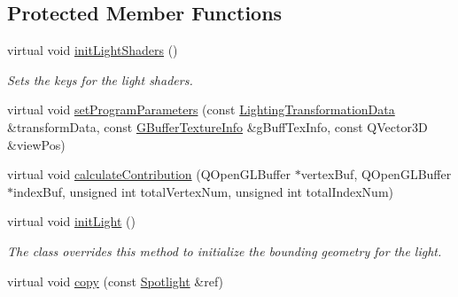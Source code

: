 \subsection*{Protected Member Functions}
\begin{DoxyCompactItemize}
\item 
\mbox{\label{class_geometry_engine_1_1_geometry_world_item_1_1_geometry_light_1_1_spotlight_a3e9b0e3c458ea56708a16f8f988b01ce}} 
virtual void \mbox{\hyperlink{class_geometry_engine_1_1_geometry_world_item_1_1_geometry_light_1_1_spotlight_a3e9b0e3c458ea56708a16f8f988b01ce}{init\+Light\+Shaders}} ()
\begin{DoxyCompactList}\small\item\em Sets the keys for the light shaders. \end{DoxyCompactList}\item 
virtual void \mbox{\hyperlink{class_geometry_engine_1_1_geometry_world_item_1_1_geometry_light_1_1_spotlight_a89686934756cc47dd810cc43d8f5f88a}{set\+Program\+Parameters}} (const \mbox{\hyperlink{class_geometry_engine_1_1_lighting_transformation_data}{Lighting\+Transformation\+Data}} \&transform\+Data, const \mbox{\hyperlink{class_geometry_engine_1_1_g_buffer_texture_info}{G\+Buffer\+Texture\+Info}} \&g\+Buff\+Tex\+Info, const Q\+Vector3D \&view\+Pos)
\item 
virtual void \mbox{\hyperlink{class_geometry_engine_1_1_geometry_world_item_1_1_geometry_light_1_1_spotlight_a6136ca2338a7b5f5be70ccab82fe655e}{calculate\+Contribution}} (Q\+Open\+G\+L\+Buffer $\ast$vertex\+Buf, Q\+Open\+G\+L\+Buffer $\ast$index\+Buf, unsigned int total\+Vertex\+Num, unsigned int total\+Index\+Num)
\item 
\mbox{\label{class_geometry_engine_1_1_geometry_world_item_1_1_geometry_light_1_1_spotlight_a47bba760d5da4f574274be437d5ddd04}} 
virtual void \mbox{\hyperlink{class_geometry_engine_1_1_geometry_world_item_1_1_geometry_light_1_1_spotlight_a47bba760d5da4f574274be437d5ddd04}{init\+Light}} ()
\begin{DoxyCompactList}\small\item\em The class overrides this method to initialize the bounding geometry for the light. \end{DoxyCompactList}\item 
virtual void \mbox{\hyperlink{class_geometry_engine_1_1_geometry_world_item_1_1_geometry_light_1_1_spotlight_a72de80e80891832884e039beec532e19}{copy}} (const \mbox{\hyperlink{class_geometry_engine_1_1_geometry_world_item_1_1_geometry_light_1_1_spotlight}{Spotlight}} \&ref)
\end{DoxyCompactItemize}
